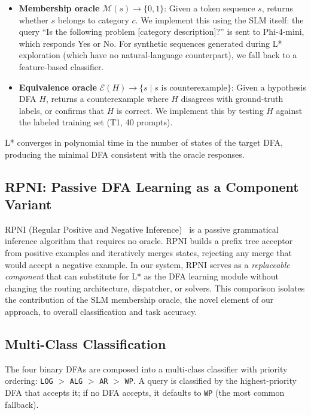\documentclass[journal]{IEEEtai}
\begin{document}
\begin{itemize}
    \item \textbf{Membership oracle} $\mathcal{M}(s) \to \{0,1\}$: Given a token sequence $s$, returns whether $s$ belongs to category $c$. We implement this using the SLM itself: the query ``Is the following problem [category description]?'' is sent to Phi-4-mini, which responds Yes or No. For synthetic sequences generated during L* exploration (which have no natural-language counterpart), we fall back to a feature-based classifier.
    \item \textbf{Equivalence oracle} $\mathcal{E}(H) \to \{s \mid s \text{ is counterexample}\}$: Given a hypothesis DFA $H$, returns a counterexample where $H$ disagrees with ground-truth labels, or confirms that $H$ is correct. We implement this by testing $H$ against the labeled training set (T1, 40 prompts).
\end{itemize}

L* converges in polynomial time in the number of states of the target DFA, producing the minimal DFA consistent with the oracle responses.

\subsection{RPNI: Passive DFA Learning as a Component Variant}
\label{sec:rpni}

RPNI (Regular Positive and Negative Inference)~\cite{oncina1992rpni} is a passive grammatical inference algorithm that requires no oracle. RPNI builds a prefix tree acceptor from positive examples and iteratively merges states, rejecting any merge that would accept a negative example. In our system, RPNI serves as a \emph{replaceable component} that can substitute for L* as the DFA learning module without changing the routing architecture, dispatcher, or solvers. This comparison isolates the contribution of the SLM membership oracle, the novel element of our approach, to overall classification and task accuracy.

\subsection{Multi-Class Classification}
\label{sec:multiclass}

The four binary DFAs are composed into a multi-class classifier with priority ordering: \texttt{LOG} $>$ \texttt{ALG} $>$ \texttt{AR} $>$ \texttt{WP}. A query is classified by the highest-priority DFA that accepts it; if no DFA accepts, it defaults to \texttt{WP} (the most common fallback).
\end{document}
